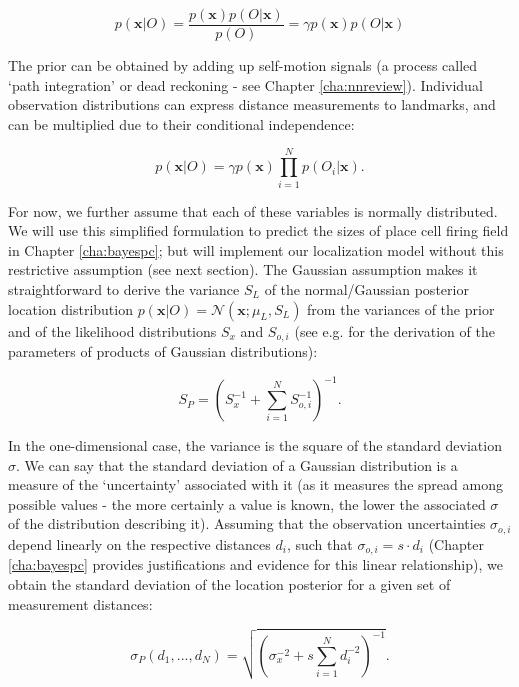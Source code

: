 \begin{equation}\label{bayes1}
p( \bm x | O ) = \frac{p( \bm x ) p( O | \bm x )}{p(O)} = \gamma p( \bm x ) p( O | \bm x )
\end{equation}

The prior can be obtained by adding up self-motion signals (a process called `path integration' or dead reckoning - see Chapter \ref{cha:nnreview}). Individual observation distributions can express distance measurements to landmarks, and can be multiplied due to their conditional independence:

\begin{equation}\label{bayes2}
p( \bm x | O ) = \gamma p( \bm x ) \prod_{i=1}^{N} p( O_i | \bm x ).
\end{equation}

For now, we further assume that each of these variables is normally distributed. We will use this simplified formulation to predict the sizes of place cell firing field in Chapter \ref{cha:bayespc}; but will implement our localization model without this restrictive assumption (see next section). The Gaussian assumption makes it straightforward to derive the variance $S_L$ of the normal/Gaussian posterior location distribution $p( \bm x | O ) = \mathcal{N}(\bm x ; \mu_L, S_L)$ from the variances of the prior and of the likelihood distributions $S_x$ and $S_{o,i}$ (see e.g. \cite{wu2004properties} for the derivation of the parameters of products of Gaussian distributions):

\begin{equation}\label{bayes3}
S_{P}=(S_x^{-1}+\sum_{i=1}^{N} S_{o,i}^{-1})^{-1}.
\end{equation}

In the one-dimensional case, the variance is the square of the standard deviation $\sigma$. We can say that the standard deviation of a Gaussian distribution is a measure of the `uncertainty' associated with it (as it measures the spread among possible values - the more certainly a value is known, the lower the associated $\sigma$ of the distribution describing it). Assuming that the observation uncertainties $\sigma_{o,i}$ depend linearly on the respective distances $d_{i}$, such that $\sigma_{o,i}=s \cdot d_{i}$ (Chapter \ref{cha:bayespc} provides justifications and evidence for this linear relationship), we obtain the standard deviation of the location posterior for a given set of measurement distances:

\begin{equation}\label{bayes4}
\sigma_{P}(d_1, ..., d_N)=\sqrt{(\sigma_x^{-2}+s \sum_{i=1}^{N} d_{i}^{-2})^{-1}}.
\end{equation}

